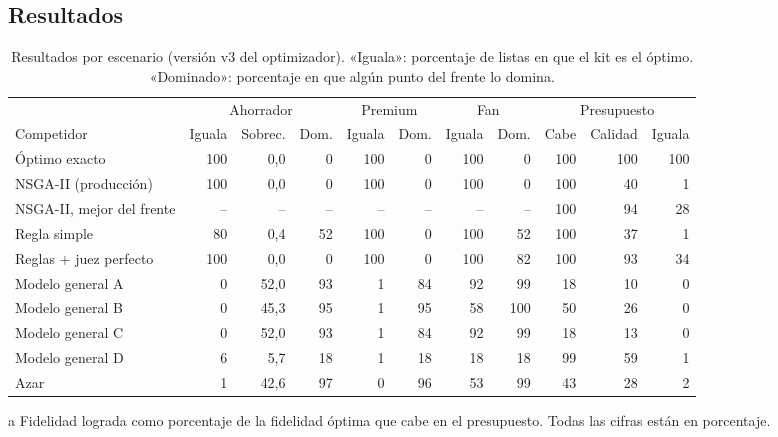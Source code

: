 \subsection{Resultados}

\begin{table}[htbp]
\centering\small
\caption{Resultados por escenario (versión v3 del optimizador). «Iguala»:
porcentaje de listas en que el kit es el óptimo. «Dominado»: porcentaje en que
algún punto del frente lo domina.}
\label{tab:resultados}
\setlength{\tabcolsep}{3.5pt}
\begin{threeparttable}
\begin{tabular}{@{}l rrr rr rr rrr@{}}
\toprule
& \multicolumn{3}{c}{Ahorrador} & \multicolumn{2}{c}{Premium} & \multicolumn{2}{c}{Fan} & \multicolumn{3}{c}{Presupuesto}\\
\cmidrule(lr){2-4}\cmidrule(lr){5-6}\cmidrule(lr){7-8}\cmidrule(l){9-11}
Competidor & Iguala & Sobrec. & Dom. & Iguala & Dom. & Iguala & Dom. & Cabe & Calidad\tnote{a} & Iguala\\
\midrule
Óptimo exacto            & 100 & 0,0 & 0  & 100 & 0  & 100 & 0   & 100 & 100 & 100\\
NSGA-II (producción)     & 100 & 0,0 & 0  & 100 & 0  & 100 & 0   & 100 & 40  & 1\\
NSGA-II, mejor del frente& --  & --  & -- & --  & -- & --  & --  & 100 & 94  & 28\\
Regla simple             & 80  & 0,4 & 52 & 100 & 0  & 100 & 52  & 100 & 37  & 1\\
Reglas + juez perfecto   & 100 & 0,0 & 0  & 100 & 0  & 100 & 82  & 100 & 93  & 34\\
Modelo general A         & 0   & 52,0& 93 & 1   & 84 & 92  & 99  & 18  & 10  & 0\\
Modelo general B         & 0   & 45,3& 95 & 1   & 95 & 58  & 100 & 50  & 26  & 0\\
Modelo general C         & 0   & 52,0& 93 & 1   & 84 & 92  & 99  & 18  & 13  & 0\\
Modelo general D         & 6   & 5,7 & 18 & 1   & 18 & 18  & 18  & 99  & 59  & 1\\
Azar                     & 1   & 42,6& 97 & 0   & 96 & 53  & 99  & 43  & 28  & 2\\
\bottomrule
\end{tabular}
\begin{tablenotes}\footnotesize
\item[a] Fidelidad lograda como porcentaje de la fidelidad óptima que cabe en
el presupuesto. Todas las cifras están en porcentaje.
\end{tablenotes}
\end{threeparttable}
\end{table}

